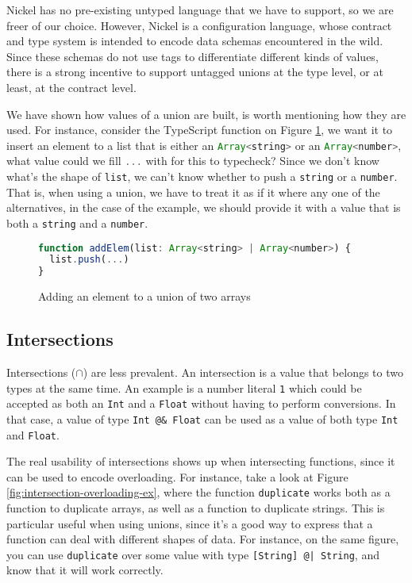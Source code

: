 \documentclass[sigplan,10pt,review,anonymous]{acmart}
\newcommand{\nickel}[1]{\lstinline[language=nickel]{#1}}
\newcommand{\typescript}[1]{\lstinline[language=JavaScript]{#1}}
\begin{document}
Nickel has no pre-existing untyped language that we have to
support, so we are freer of our choice.
However, Nickel is a configuration language, whose contract and type system
is intended to encode data schemas encountered in the wild. Since these schemas do not use
tags to differentiate different kinds of values, there is a strong incentive to support untagged unions at the
type level, or at least, at the contract level.

We have shown how values of a union are built, is worth mentioning
how they are used.
For instance, consider the TypeScript function on Figure \ref{fig:addElem},
we want it to insert an element to a list that is either an
\typescript{Array<string>} or an \typescript{Array<number>},
what value could we fill \typescript{...} with for this to typecheck?
Since we don't know what's the shape of \typescript{list},
we can't know whether to push a \typescript{string} or a
\typescript{number}.
That is, when using a union, we have to treat it as if it where any one
of the alternatives, in the case of the example, we should provide
it with a value that is both a \typescript{string} and a \typescript{number}.

\begin{figure}[h]
\begin{lstlisting}[language=JavaScript]
function addElem(list: Array<string> | Array<number>) {
  list.push(...)
}
\end{lstlisting}
\caption{Adding an element to a union of two arrays}
\label{fig:addElem}
\end{figure}



\subsection{Intersections}

Intersections ($\cap$) are less prevalent. An intersection is a value that belongs to
two types at the same time. An example is a number literal \nickel{1}
which could be accepted as both an \nickel{Int} and a \nickel{Float} without
having to perform conversions.
In that case, a value of type \nickel{Int @& Float} can be used as a value of
both type \nickel{Int} and \nickel{Float}.


The real usability of intersections shows up when intersecting
functions, since it can be used to encode overloading.
For instance, take a look at Figure
\ref{fig:intersection-overloading-ex}, where the function
\nickel{duplicate} works both as a function to duplicate
arrays, as well as a function to duplicate strings.
This is particular useful when using unions, since it's a
good way to express that a function can deal with different
shapes of data.
For instance, on the same figure, you can use \nickel{duplicate}
over some value with type \nickel{[String] @| String}, and know
that it will work correctly.
\end{document}
